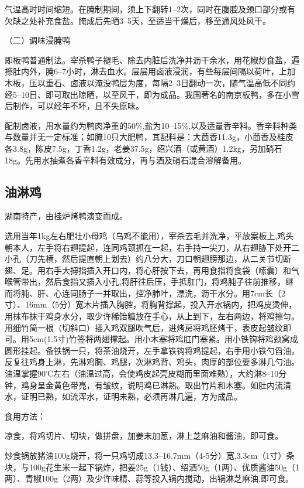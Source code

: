 \documentclass{ctexbook}
\begin{document}
气温高时时间缩短。在腌制期间，须上下翻转1--2次，同时在腹腔及颈口部分或有欠缺之处补充食盐。腌成后先晒3--5天，至适当干燥后，移至通风处风干。

（二）调味浸腌鸭

即板鸭普通制法。宰杀鸭子褪毛、除去内脏后洗净并沥干余水，用花椒炒食盐，遍擦肚内外，腌6--7小时，淋去血水。层层用卤液浸润，有些每层间隔以荷叶，上加木板，压以重石、卤液以淹没鸭层为度，每隔2--3日翻动一次，随气温高低不同约经5--10日、即可取出晾晒，以至风干，即为成品。我国著名的南京板鸭，多在小雪后制作，可以经年不坏，且不失原味。

配制卤液，用水量约为鸭肉净重的50\%,盐为10--15\%,以及适量香辛料。香辛料种类与数量并无一定标准；如腌10只大肥鸭，其配料是：大茴香11.3g，小茴香及桂皮各3.8g，陈皮7.5g，丁香1.2g，老姜37.5g，绍兴酒（或黄酒）1.2kg，另加硝石18g。先用水抽煮各香辛料有效成分，再与酒及硝石混合溶解备用。

\subsection{油淋鸡}
湖南特产，由挂炉烤鸭演变而成。

选用当年1kg左右肥壮小母鸡（乌鸡不能用），宰杀去毛并洗净，平放案板上,鸡头朝本人，左手将右翅提起，连同鸡颈抓在一起，右手持一尖刀，从右翅胁下处开二小孔（刀先横，然后提直朝上划去）约八分大，刀口朝翅膀那边，从二关节切断翅、足。用右手大拇指插入开口内，将心肝按下去，再用食指将食袋（嗦囊）和气喉管带出，然后食指又插入小孔,将肝往后压，手抵肛门，将鸡肫子往前推移，继而将肫、肝、心连同肠子一并取出，控净肺叶，漂洗，沥干水分。用7cm长（2寸）、16mm（5分）宽木片插入胸腔，将胸背撑起，投入开水锅内，把鸡皮烫伸，用抹布抹干鸡身水分，取少许稀饴糖放在手心，从上到下，左右两边，将鸡擦匀。用细竹简一根（切斜口）插入鸡双腿吹气后，进烤房将鸡胚烤干，表皮起皱纹即可。用5cm(1.5寸)竹签将两翅撑起。用小木塞将鸡肛门塞紧。用小铁钩将鸡颈窝成圆形挂起。备铁锅一只，将茶油烧开，左手拿铁钩将鸡提起，右手用小铁勺舀油，反复往鸡身上淋，先淋鸡胸、鸡腿，次淋鸡背、鸡头，肉厚的部位要多淋几勺油。油温掌握90℃左右（油温过高，会使鸡皮起壳皮糊而里面难熟），大约淋8--10分钟，鸡身呈金黄色带亮，有皱纹，说明鸡已淋熟。取出竹片和木塞。如肚内流清水，证明已熟，如流浑水，证明未熟，必须再淋几遍，方为成品。

食用方法：

凉食，将鸡切片、切块，做拼盘，加姜末加葱，淋上芝麻油和酱油，即可食。

炒食锅放猪油100g烧开，将一只鸡切成13.3--16.7mm（4-5分）宽,3.3cm（1寸）条块，与100g花生米一起下锅炸，把姜25g（1钱）、绍酒50g（1两）、优质酱油50g（1两）、青椒100g（2两）及少许味精、蒜等投入锅内搅动，出锅淋芝麻油,即可食。
\end{document}
